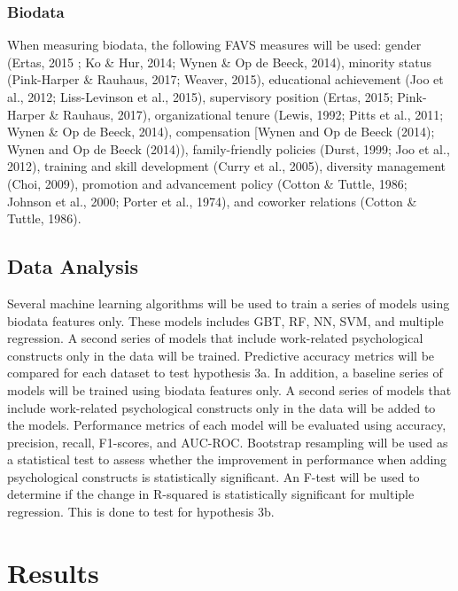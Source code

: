 \documentclass[
  man]{apa7}
\begin{document}
\hypertarget{biodata}{%
\subsubsection{Biodata}\label{biodata}}

When measuring biodata, the following FAVS measures will be used: gender (Ertas, 2015 ; Ko \& Hur, 2014; Wynen \& Op de Beeck, 2014), minority status (Pink-Harper \& Rauhaus, 2017; Weaver, 2015), educational achievement (Joo et al., 2012; Liss-Levinson et al., 2015), supervisory position (Ertas, 2015; Pink-Harper \& Rauhaus, 2017), organizational tenure (Lewis, 1992; Pitts et al., 2011; Wynen \& Op de Beeck, 2014),
compensation {[}Wynen and Op de Beeck (2014); Wynen and Op de Beeck (2014)), family-friendly policies (Durst, 1999; Joo et al., 2012), training and skill development (Curry et al., 2005), diversity management (Choi, 2009), promotion and advancement policy (Cotton \& Tuttle, 1986; Johnson et al., 2000; Porter et al., 1974), and coworker relations (Cotton \& Tuttle, 1986).

\hypertarget{data-analysis-1}{%
\subsection{Data Analysis}\label{data-analysis-1}}

Several machine learning algorithms will be used to train a series of models using biodata features only. These models includes GBT, RF, NN, SVM, and multiple regression. A second series of models that include work-related psychological constructs only in the data will be trained. Predictive accuracy metrics will be compared for each dataset to test hypothesis 3a.
In addition, a baseline series of models will be trained using biodata features only. A second series of models that include work-related psychological constructs only in the data will be added to the models. Performance metrics of each model will be evaluated using accuracy, precision, recall, F1-scores, and AUC-ROC. Bootstrap resampling will be used as a statistical test to assess whether the improvement in performance when adding psychological constructs is statistically significant. An F-test will be used to determine if the change in R-squared is statistically significant for multiple regression. This is done to test for hypothesis 3b.

\hypertarget{results}{%
\section{Results}\label{results}}
\end{document}
